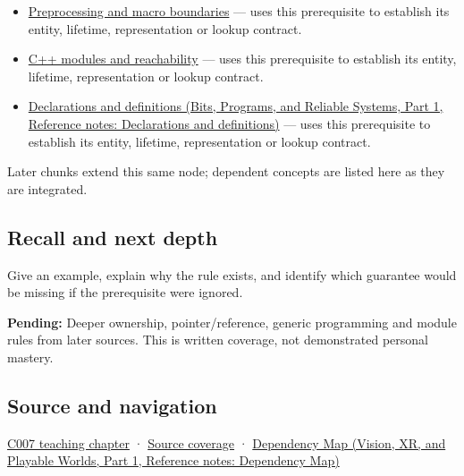\hypertarget{appendix-806686359e1b-used-by}{}

\begin{itemize}
\item
  \hyperref[appendix-33c0a92ce855]{Preprocessing and macro boundaries} --- uses this prerequisite to establish its entity, lifetime, representation or lookup contract.
\item
  \hyperref[appendix-410a611a5b8d]{C++ modules and reachability} --- uses this prerequisite to establish its entity, lifetime, representation or lookup contract.
\item
  \href{../01-Bits-Programs-and-Reliable-Systems-P01/main.pdf\#nameddest=appendix-2e4d494c2d94}{Declarations and definitions (Bits, Programs, and Reliable Systems, Part 1, Reference notes: Declarations and definitions)} --- uses this prerequisite to establish its entity, lifetime, representation or lookup contract.
\end{itemize}

Later chunks extend this same node; dependent concepts are listed here as they are integrated.

\subsection{Recall and next depth}\label{appendix-806686359e1b-recall-and-next-depth}

\hypertarget{appendix-806686359e1b-recall-and-next-depth}{}

Give an example, explain why the rule exists, and identify which guarantee would be missing if the prerequisite were ignored.

\textbf{Pending:} Deeper ownership, pointer/reference, generic programming and module rules from later sources. This is written coverage, not demonstrated personal mastery.

\subsection{Source and navigation}\label{appendix-806686359e1b-source-and-navigation}

\hypertarget{appendix-806686359e1b-source-and-navigation}{}

\hyperref[01-foundations-i-ch002-giving-a-program-a-buildable-shape]{C007 teaching chapter} · \hyperref[appendix-fd090d982a15-m007---parts-101-112]{Source coverage} · \href{../07-Vision-XR-and-Playable-Worlds-P01/main.pdf\#nameddest=appendix-4ad47bdd269a}{Dependency Map (Vision, XR, and Playable Worlds, Part 1, Reference notes: Dependency Map)}
